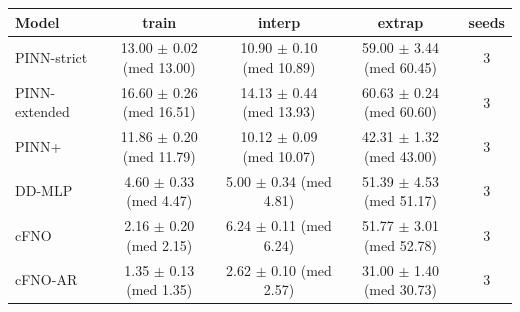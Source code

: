 \begin{tabular}{lcccc}
\toprule
Model & train & interp & extrap & seeds \\
\midrule
PINN-strict & 13.00 $\pm$ 0.02 (med 13.00) & 10.90 $\pm$ 0.10 (med 10.89) & 59.00 $\pm$ 3.44 (med 60.45) & 3 \\
PINN-extended & 16.60 $\pm$ 0.26 (med 16.51) & 14.13 $\pm$ 0.44 (med 13.93) & 60.63 $\pm$ 0.24 (med 60.60) & 3 \\
PINN+ & 11.86 $\pm$ 0.20 (med 11.79) & 10.12 $\pm$ 0.09 (med 10.07) & 42.31 $\pm$ 1.32 (med 43.00) & 3 \\
DD-MLP & 4.60 $\pm$ 0.33 (med 4.47) & 5.00 $\pm$ 0.34 (med 4.81) & 51.39 $\pm$ 4.53 (med 51.17) & 3 \\
cFNO & 2.16 $\pm$ 0.20 (med 2.15) & 6.24 $\pm$ 0.11 (med 6.24) & 51.77 $\pm$ 3.01 (med 52.78) & 3 \\
cFNO-AR & 1.35 $\pm$ 0.13 (med 1.35) & 2.62 $\pm$ 0.10 (med 2.57) & 31.00 $\pm$ 1.40 (med 30.73) & 3 \\
\bottomrule
\end{tabular}
